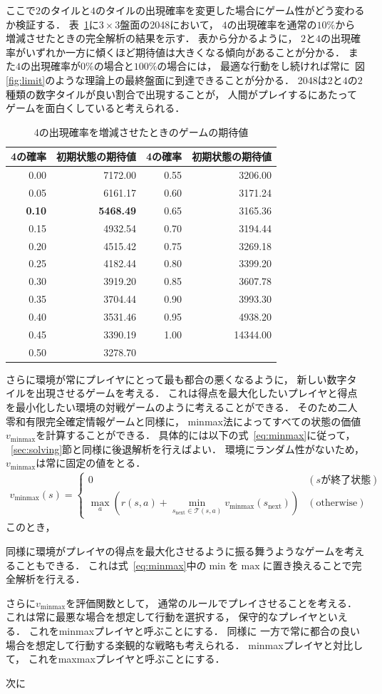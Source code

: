 ここで$2$のタイルと$4$のタイルの出現確率を変更した場合にゲーム性がどう変わるか検証する．
表~\ref{table: value_table}に$3 \times 3$盤面の2048において， $4$の出現確率を通常の$10\%$から増減させたときの完全解析の結果を示す．
表から分かるように， $2$と$4$の出現確率がいずれか一方に傾くほど期待値は大きくなる傾向があることが分かる．
また$4$の出現確率が$0\%$の場合と$100\%$の場合には， 最適な行動をし続ければ常に~図\ref{fig:limit}のような理論上の最終盤面に到達できることが分かる．
2048は$2$と$4$の$2$種類の数字タイルが良い割合で出現することが， 人間がプレイするにあたってゲームを面白くしていると考えられる．
\begin{table}[t]
\caption{4の出現確率を増減させたときのゲームの期待値}
\label{table: value_table}
\centering
\begin{tabular}{r|r||r|r}
    \hline 
    4の確率 & 初期状態の期待値 & 4の確率 & 初期状態の期待値 \\ \hline \hline
    0.00 & 7172.00 & 0.55 & 3206.00 \\
    0.05 & 6161.17 & 0.60 & 3171.24 \\
    \textbf{0.10} & \textbf{5468.49} & 0.65 & 3165.36 \\
    0.15 & 4932.54 & 0.70 & 3194.44 \\
    0.20 & 4515.42 & 0.75 & 3269.18 \\
    0.25 & 4182.44 & 0.80 & 3399.20 \\
    0.30 & 3919.20 & 0.85 & 3607.78 \\
    0.35 & 3704.44 & 0.90 & 3993.30 \\
    0.40 & 3531.46 & 0.95 & 4938.20 \\
    0.45 & 3390.19 & 1.00 & 14344.00 \\
    0.50 & 3278.70 &  & \\
    \hline
\end{tabular}
\end{table}

さらに環境が常にプレイヤにとって最も都合の悪くなるように， 新しい数字タイルを出現させるゲームを考える．
これは得点を最大化したいプレイヤと得点を最小化したい環境の対戦ゲームのように考えることができる．
そのため二人零和有限完全確定情報ゲームと同様に， minmax法によってすべての状態の価値$v_{\text{minmax}}$を計算することができる．
具体的には以下の式~\ref{eq:minmax}に従って， ~\ref{sec:solving}節と同様に後退解析を行えばよい．
環境にランダム性がないため， $v_{\text{minmax}}$は常に固定の値をとる．
\begin{align}
    v_{\text{minmax}}(s) =
    \begin{cases}
        0 & (s \text{が終了状態}) \\
        \max_a \left(r(s,a) + \min_{s_\text{next} \in \mathcal{T}(s,a)} v_{\text{minmax}}(s_\text{next}) \right) & (\text{otherwise})
    \end{cases}
    \label{eq:minmax}
\end{align}
このとき， 

同様に環境がプレイヤの得点を最大化させるように振る舞うようなゲームを考えることもできる．
これは式~\ref{eq:minmax}中の$\min$を$\max$に置き換えることで完全解析を行える．

さらに$v_{\text{minmax}}$を評価関数として， 通常のルールでプレイさせることを考える．
これは常に最悪な場合を想定して行動を選択する， 保守的なプレイヤといえる．
これをminmaxプレイヤと呼ぶことにする．
同様に
一方で常に都合の良い場合を想定して行動する楽観的な戦略も考えられる．
minmaxプレイヤと対比して， これをmaxmaxプレイヤと呼ぶことにする．

次に